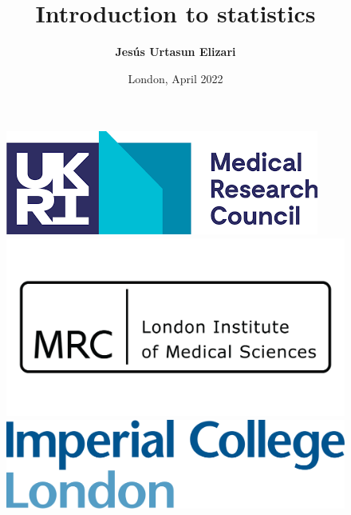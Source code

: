 \documentclass[aspectratio=43]{beamer}
\title[Introduction to statistics]{Introduction to statistics}
\author{\textbf {Jes\'us Urtasun Elizari}}
\date{London, April 2022}
\begin{document}
\begin{frame}

	\vspace{1.0 cm}
	
	
	\vspace{0.25 cm}
	
	\begin{figure}
		\includegraphics[width = 3.0 cm]{plots/front_page/mrc.png}
		\hfill
		\includegraphics[width = 3.0 cm]{plots/front_page/lms.png}
		\hfill
		\includegraphics[width = 3.0 cm]{plots/front_page/icl.png}
		\endminipage
	\end{figure}

\end{frame}
\end{document}
